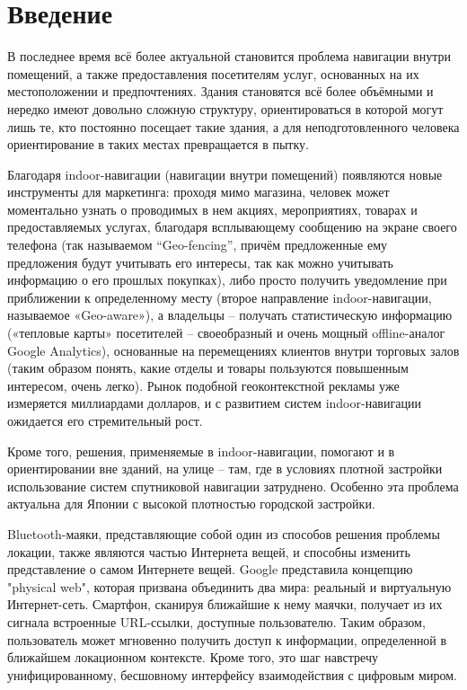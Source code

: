 \section*{Введение}

В последнее время всё более актуальной становится проблема навигации внутри помещений, а также предоставления посетителям услуг, основанных на их местоположении и предпочтениях. Здания становятся всё более объёмными и нередко имеют довольно сложную структуру, ориентироваться в которой могут лишь те, кто постоянно посещает такие здания, а для неподготовленного человека ориентирование в таких местах превращается в пытку.

Благодаря indoor-навигации (навигации внутри помещений) появляются новые инструменты для маркетинга: проходя мимо магазина, человек может моментально узнать о проводимых в нем акциях, мероприятиях, товарах и предоставляемых услугах, благодаря всплывающему сообщению на экране своего телефона (так называемом “Geo-fencing”, причём предложенные ему предложения будут учитывать его интересы, так как можно учитывать информацию о его прошлых покупках), либо просто получить уведомление при приближении к определенному месту (второе направление indoor-навигации, называемое «Geo-aware»), а владельцы – получать статистическую информацию («тепловые карты» посетителей – своеобразный и очень мощный offline-аналог Google Analytics), основанные на перемещениях клиентов внутри торговых залов (таким образом понять, какие отделы и товары пользуются повышенным интересом, очень легко). Рынок подобной геоконтекстной рекламы уже измеряется миллиардами долларов, и с развитием систем indoor-навигации ожидается его стремительный рост.

Кроме того, решения, применяемые в indoor-навигации, помогают и в ориентировании вне зданий, на улице – там, где в условиях плотной застройки использование систем спутниковой навигации затруднено. Особенно эта проблема актуальна для Японии с высокой плотностью городской застройки.

Bluetooth-маяки, представляющие собой один из способов решения проблемы локации, также являются частью Интернета вещей, и способны изменить представление о самом Интернете вещей. Google представила концепцию "physical web", которая призвана объединить два мира: реальный и виртуальную Интернет-сеть. Смартфон, сканируя ближайшие к нему маячки, получает из их сигнала встроенные URL-ссылки, доступные пользователю. Таким образом, пользователь может мгновенно получить доступ к информации, определенной в ближайшем локационном контексте. Кроме того, это шаг навстречу унифицированному, бесшовному интерфейсу взаимодействия с цифровым миром.

